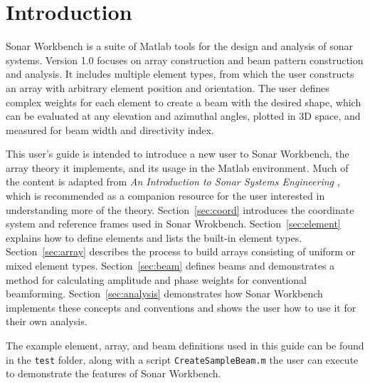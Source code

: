 \section{Introduction}\label{sec:intro}

Sonar Workbench is a suite of Matlab tools for the design and analysis of sonar systems. Version 1.0 focuses on array construction and beam pattern construction and analysis. It includes multiple element types, from which the user constructs an array with arbitrary element position and orientation. The user defines complex weights for each element to create a beam with the desired shape, which can be evaluated at any elevation and azimuthal angles, plotted in 3D space, and measured for beam width and directivity index.

This user's guide is intended to introduce a new user to Sonar Workbench, the array theory it implements, and its usage in the Matlab environment. Much of the content is adapted from \emph{An Introduction to Sonar Systems Engineering} \cite{Ziomek}, which is recommended as a companion resource for the user interested in understanding more of the theory. Section~\ref{sec:coord} introduces the coordinate system and reference frames used in Sonar Wrokbench. Section~\ref{sec:element} explains how to define elements and lists the built-in element types. Section~\ref{sec:array} describes the process to build arrays consisting of uniform or mixed element types. Section~\ref{sec:beam} defines beams and demonstrates a method for calculating amplitude and phase weights for conventional beamforming. Section~\ref{sec:analysis} demonstrates how Sonar Workbench implements these concepts and conventions and shows the user how to use it for their own analysis.

The example element, array, and beam definitions used in this guide can be found in the \texttt{test} folder, along with a script \texttt{CreateSampleBeam.m} the user can execute to demonstrate the features of Sonar Workbench. 